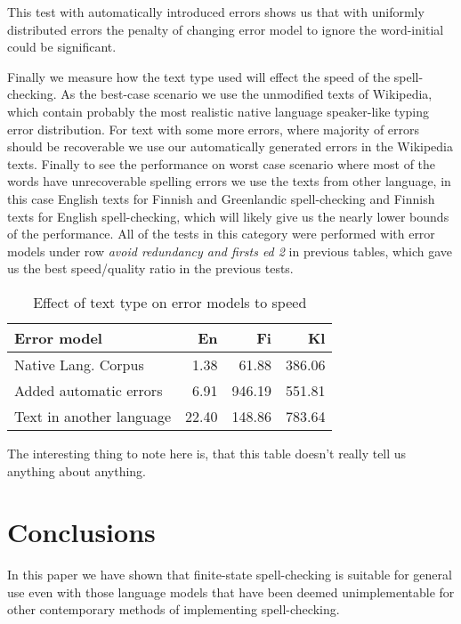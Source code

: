 \documentclass[11pt]{article}
\begin{document}
This test with automatically introduced errors shows us that with uniformly
distributed errors the penalty of changing error model to ignore the
word-initial could be significant.

Finally we measure how the text type used will effect the speed of the
spell-checking. As the best-case scenario we use the unmodified texts of
Wikipedia, which contain probably the most realistic native language
speaker-like typing error distribution. For text with some more errors, where
majority of errors should be recoverable we use our automatically generated
errors in the Wikipedia texts. Finally to see the performance on worst case
scenario where most of the words have unrecoverable spelling errors we use the
texts from other language, in this case English texts for Finnish and 
Greenlandic spell-checking and Finnish texts for English spell-checking, which
will likely give us the nearly lower bounds of the performance. All of the
tests in this category were performed with error models under row
\emph{avoid redundancy and firsts ed 2} in previous tables, which gave us 
the best speed/quality ratio in the previous tests.

\begin{table}[h]
\begin{center}
\begin{scriptsize}
\begin{tabular}{|l|rrr|}
\hline
\bf Error model & \bf En & \bf Fi & \bf Kl  \\ 
\hline
\hline
Native Lang. Corpus &
1.38&61.88&386.06
\\
Added automatic errors &
6.91&946.19&551.81
\\
Text in another language &
22.40&148.86&783.64
\\
\end{tabular}
\end{scriptsize}
\end{center}
\caption{\label{table:language-vs-text-type} Effect of text type on
error models to speed}
\end{table}

The interesting thing to note here is, that this table doesn't really tell us
anything about anything. 


\section{Conclusions}
\label{sec:conclusions}

In this paper we have shown that finite-state spell-checking is suitable for
general use even with those language models that have been deemed
unimplementable for other contemporary methods of implementing spell-checking.





\end{document}
